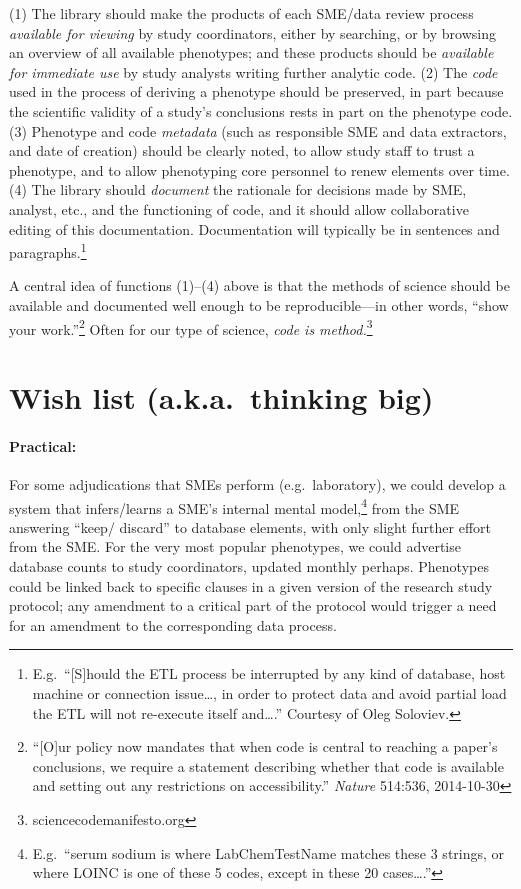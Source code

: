\documentclass{tufte-handout}
\begin{document}
(1) The library should make the products of each SME/data review
process \emph{available for viewing} by study coordinators, either by
searching, or by browsing an overview of all available phenotypes; and
these products should be \emph{available for immediate use} by study
analysts writing further analytic code. (2) The \emph{code} used in
the process of deriving a phenotype should be preserved, in part
because the scientific validity of a study's conclusions rests in part
on the phenotype code. (3) Phenotype and code \emph{metadata} (such as
responsible SME and data extractors, and date of creation) should be
clearly noted, to allow study staff to trust a phenotype, and to allow
phenotyping core personnel to renew elements over time. (4) The
library should \emph{document} the rationale for decisions made by
SME, analyst, etc., and the functioning of code, and it should allow
collaborative editing of this documentation. Documentation will
typically be in sentences and paragraphs.\footnote{E.g.\ ``[S]hould
  the ETL process be interrupted by any kind of database, host machine
  or connection issue\ldots{}, in order to protect data and avoid
  partial load the ETL will not re-execute itself and\ldots{}.''
  Courtesy of Oleg Soloviev.}

\newpage

A central idea of functions (1)--(4) above is that the methods of
science should be available and documented well enough to be
reproducible---in other words, ``show your work.''\footnote{``[O]ur
  policy now mandates that when code is central to reaching a paper's
  conclusions, we require a statement describing whether that code is
  available and setting out any restrictions on accessibility.''
  \emph{Nature} 514:536, 2014-10-30} Often for our type of science,
\emph{code is method.}\footnote{sciencecodemanifesto.org}

\section{Wish list (a.k.a.\ thinking big)}

\paragraph{Practical:}
For some adjudications that SMEs perform (e.g.\ laboratory), we could
develop a system that infers\slash learns a SME's internal mental
model,\footnote{E.g.\ ``serum sodium is where LabChemTestName matches
  these 3 strings, or where LOINC is one of these 5 codes, except in
  these 20 cases\ldots{}.''} from the SME answering ``keep\slash
discard'' to database elements, with only slight further effort from
the SME. For the very most popular phenotypes, we could advertise
database counts to study coordinators, updated monthly perhaps.
Phenotypes could be linked back to specific clauses in a given version
of the research study protocol; any amendment to a critical part of
the protocol would trigger a need for an amendment to the
corresponding data process.
\end{document}
